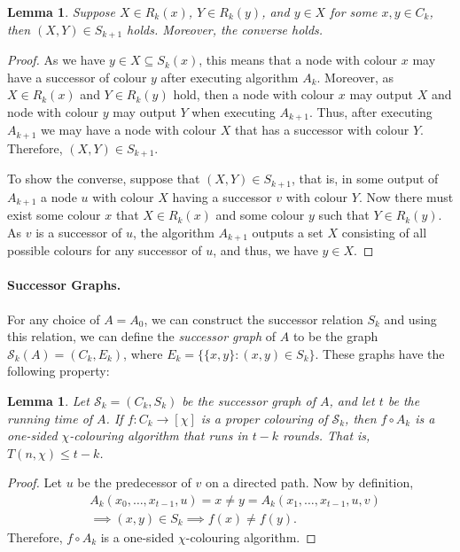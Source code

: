 \documentclass[a4paper,11pt]{article}
\newtheorem{lemma}[theorem]{Lemma}
\theoremstyle{remark}
\newcommand{\cS}{\mathcal{S}}
\begin{document}
\begin{lemma}
 Suppose $X \in R_k(x)$, $Y \in R_k(y)$, and $y \in X$ for some $x,y \in C_k$, then $(X,Y) \in S_{k+1}$ holds. Moreover, the converse holds.
\end{lemma}
\begin{proof}
 As we have $y \in X \subseteq S_k(x)$, this means that a node with colour $x$ may have a successor of colour $y$ after executing algorithm $A_k$. Moreover, as $X \in R_k(x)$ and $Y \in R_k(y)$ hold, then a node with colour $x$ may output $X$ and node with colour $y$ may output $Y$ when executing $A_{k+1}$. Thus, after executing $A_{k+1}$ we may have a node with colour $X$ that has a successor with colour $Y$. Therefore, $(X,Y) \in S_{k+1}$.

 To show the converse, suppose that $(X,Y) \in S_{k+1}$, that is, in some output of $A_{k+1}$ a node $u$ with colour $X$ having a successor $v$ with colour $Y$. Now there must exist some colour $x$ that $X \in R_k(x)$ and some colour $y$ such that $Y \in R_k(y)$. As $v$ is a successor of $u$, the algorithm $A_{k+1}$ outputs a set $X$ consisting of all possible colours for any successor of $u$, and thus, we have $y \in X$.
\end{proof}

\paragraph{Successor Graphs.} For any choice of $A=A_0$, we can construct the successor relation $S_k$ and using this relation, we can define the \emph{successor graph} of $A$ to be the graph $\cS_k(A) = (C_k, E_k)$, where $E_k = \{ \{x,y\} : (x,y) \in S_k \}$. These graphs have the following property:
\begin{lemma} \label{lemma:chromatic}
 Let $\cS_k = (C_k, S_k)$ be the successor graph of $A$, and let $t$ be the running time of $A$. If $f \colon C_k \to [\chi]$ is a proper colouring of $\cS_k$, then $f \circ A_k$ is a one-sided $\chi$-colouring algorithm that runs in $t-k$ rounds. That is, $T(n,\chi) \le t-k$.
\end{lemma}
\begin{proof}
 Let $u$ be the predecessor of $v$ on a directed path. Now by definition, 
\begin{align*}
         &A_k(x_0, \dots, x_{t-1}, u) = x \neq y = A_k(x_1, \dots, x_{t-1}, u, v) \\
&\implies (x,y) \in S_k \implies f(x) \neq f(y).
\end{align*}
Therefore, $f \circ A_k$ is a one-sided $\chi$-colouring algorithm.
 \end{proof}
\end{document}

